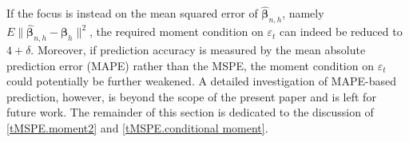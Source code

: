 \documentclass[ejsv2]{imsart}
\theoremstyle{plain}
\theoremstyle{definition}
\theoremstyle{remark}
\begin{document}

If the focus
is instead on
the mean squared error of
$\hat{\bm{\beta}}_{n,h}$, namely
$E\lVert 
\hat{\bm{\beta}}_{n,h}-\bm{\beta}_h\rVert^2$, the required moment
condition on $\varepsilon_t$ can indeed be reduced to $4+\delta$.
Moreover, if prediction
accuracy is measured by the mean absolute prediction error (MAPE) rather than the MSPE, the
moment condition on $\varepsilon_t$
could potentially be further weakened. A detailed investigation of MAPE-based prediction, however, is beyond the scope of the
present paper and is left for future work.
The remainder of this section is dedicated to the discussion of 
\eqref{tMSPE.moment2} and \eqref{tMSPE.conditional moment}.
\end{document}
